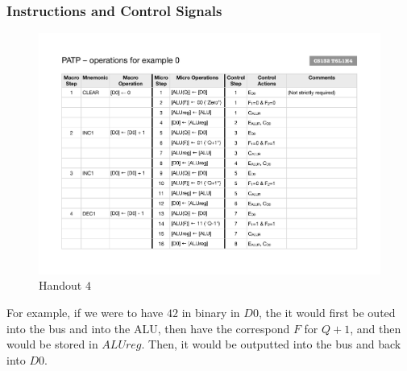 \documentclass[a4paper]{article}
\theoremstyle{plain}
\theoremstyle{definition}
\theoremstyle{remark}
\begin{document}
\subsubsection{Instructions and Control Signals}
\begin{figure}[H]
	\centering
	\includegraphics[width=1\textwidth]{PATP/4.pdf}
	\caption{Handout $4$}
	\label{fig:PATP-4-png}
\end{figure}
For example, if we were to have $42$ in binary in $D 0$, the it would first be outed into the bus and into the ALU, then have the correspond $F$ for $Q+ 1$, and then would be stored in $ALUreg$. Then, it would be outputted into the bus and back into $D 0$.
\end{document}
